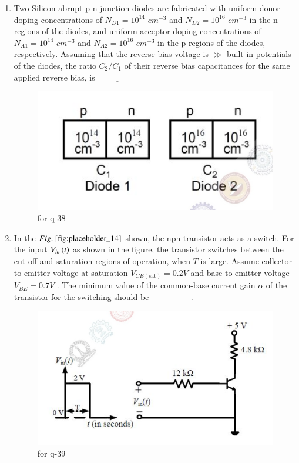 \documentclass[journal,12pt,onecolumn]{IEEEtran}
\theoremstyle{remark}
\begin{document}
\begin{enumerate}
\item Two Silicon abrupt p-n junction diodes are fabricated with uniform donor doping concentrations of $N_{D1} = 10^{14}$ $cm^{-3}$ and $N_{D2} = 10^{16}$ $cm^{-3}$ in the n-regions of the diodes, and uniform acceptor doping concentrations of $N_{A1} = 10^{14}$ $cm^{-3}$ and $N_{A2} = 10^{16}$ $cm^{-3}$ in the p-regions of the diodes, respectively. Assuming that the reverse bias voltage is $\gg$ built-in potentials of the diodes, the ratio $C_2/C_1$ of their reverse bias capacitances for the same applied reverse bias, is $\underline{\hspace{2cm}}$
\begin{figure}[H]
    \centering
    \includegraphics[width=0.5\columnwidth]{figs/13.png}
    \caption{\centering for q-38}
    \label{fig:placeholder_13}
\end{figure}

\hfill {}

\item In the $\figref{fig:placeholder_14}$ shown, the npn transistor acts as a switch. For the input $V_{in}\left(t\right)$ as shown in the figure, the transistor switches between the cut-off and saturation regions of operation, when $T$ is large. Assume collector-to-emitter voltage at saturation $V_{CE(\text{sat})} = 0.2 V$  and base-to-emitter voltage $V_{BE} = 0.7V$ . The minimum value of the common-base current gain $\alpha$ of the transistor for the switching should be $\underline{\hspace{2cm}}$.
\begin{figure}[H]
    \centering
    \includegraphics[width=0.5\columnwidth]{figs/14.png}
    \caption{\centering for q-39}
    \label{fig:placeholder_14}
\end{figure}


\end{enumerate}
\end{document}
